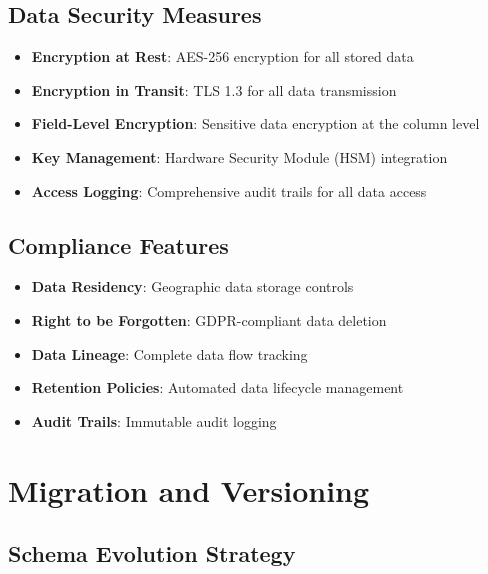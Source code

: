 \documentclass[12pt,a4paper]{article}
\begin{document}
\subsection{Data Security Measures}

\begin{itemize}
    \item \textbf{Encryption at Rest}: AES-256 encryption for all stored data
    \item \textbf{Encryption in Transit}: TLS 1.3 for all data transmission
    \item \textbf{Field-Level Encryption}: Sensitive data encryption at the column level
    \item \textbf{Key Management}: Hardware Security Module (HSM) integration
    \item \textbf{Access Logging}: Comprehensive audit trails for all data access
\end{itemize}

\subsection{Compliance Features}

\begin{itemize}
    \item \textbf{Data Residency}: Geographic data storage controls
    \item \textbf{Right to be Forgotten}: GDPR-compliant data deletion
    \item \textbf{Data Lineage}: Complete data flow tracking
    \item \textbf{Retention Policies}: Automated data lifecycle management
    \item \textbf{Audit Trails}: Immutable audit logging
\end{itemize}

\section{Migration and Versioning}

\subsection{Schema Evolution Strategy}
\end{document}
